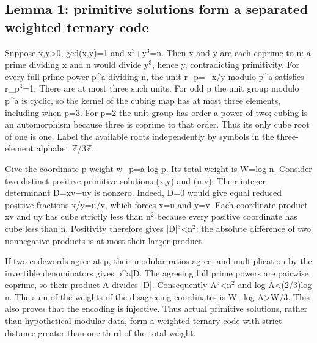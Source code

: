 \documentclass[11pt,a4paper]{article}
\begin{document}
\subsection{Lemma 1: primitive solutions form a separated weighted ternary code}
Suppose x,y>0, gcd(x,y)=1 and x\ensuremath{^3}+y\ensuremath{^3}=n. Then x and y are each coprime to n: a prime dividing x and n would divide y\ensuremath{^3}, hence y, contradicting primitivity. For every full prime power p\textasciicircum{}a dividing n, the unit r\_p=\ensuremath{-}x/y modulo p\textasciicircum{}a satisfies r\_p\ensuremath{^3}=1. There are at most three such units. For odd p the unit group modulo p\textasciicircum{}a is cyclic, so the kernel of the cubing map has at most three elements, including when p=3. For p=2 the unit group has order a power of two; cubing is an automorphism because three is coprime to that order. Thus its only cube root of one is one. Label the available roots independently by symbols in the three-element alphabet \ensuremath{\mathbb{Z}}/3\ensuremath{\mathbb{Z}}.

Give the coordinate p weight w\_p=a log p. Its total weight is W=log n. Consider two distinct positive primitive solutions (x,y) and (u,v). Their integer determinant D=xv\ensuremath{-}uy is nonzero. Indeed, D=0 would give equal reduced positive fractions x/y=u/v, which forces x=u and y=v. Each coordinate product xv and uy has cube strictly less than n\ensuremath{^2} because every positive coordinate has cube less than n. Positivity therefore gives |D|\ensuremath{^3}<n\ensuremath{^2}: the absolute difference of two nonnegative products is at most their larger product.

If two codewords agree at p, their modular ratios agree, and multiplication by the invertible denominators gives p\textasciicircum{}a|D. The agreeing full prime powers are pairwise coprime, so their product A divides |D|. Consequently A\ensuremath{^3}<n\ensuremath{^2} and log A<(2/3)log n. The sum of the weights of the disagreeing coordinates is W\ensuremath{-}log A>W/3. This also proves that the encoding is injective. Thus actual primitive solutions, rather than hypothetical modular data, form a weighted ternary code with strict distance greater than one third of the total weight.
\end{document}
